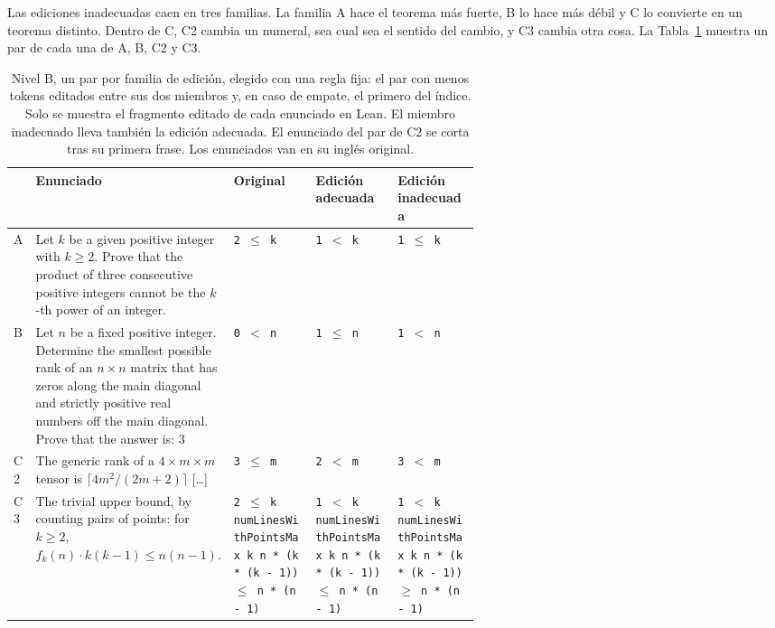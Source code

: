 \documentclass[10pt]{article}
\begin{document}
Las ediciones inadecuadas caen en tres familias. La familia A hace el teorema más fuerte, B lo hace más débil y C
lo convierte en un teorema distinto. Dentro de C, C2 cambia un numeral, sea cual sea el sentido del cambio, y C3 cambia otra cosa.
La Tabla~\ref{tab:bejemplos} muestra un par de cada una de A, B, C2 y C3.

\begin{table}[h]
\centering
\caption{Nivel B, un par por familia de edición, elegido con una regla fija: el par con menos tokens editados entre sus dos miembros y, en caso de empate, el primero del índice. Solo se muestra el fragmento editado de cada enunciado en Lean. El miembro inadecuado lleva también la edición adecuada. El enunciado del par de C2 se corta tras su primera frase. Los enunciados van en su inglés original.}
\label{tab:bejemplos}
\vspace{2pt}
{\footnotesize
\begin{tabularx}{\linewidth}{@{}lX>{\raggedright\arraybackslash}p{0.2\linewidth}>{\raggedright\arraybackslash}p{0.2\linewidth}>{\raggedright\arraybackslash}p{0.2\linewidth}@{}}
\toprule
 & Enunciado & Original & Edición adecuada & Edición inadecuada\\
\midrule
A & Let \(k\) be a given positive integer with \(k\geqslant2\). Prove that the product of three consecutive positive integers cannot be the \(k\) -th power of an integer. & \texttt{2 $\le$ k} & \texttt{1 $<$ k} & \texttt{1 $\le$ k}\\
\addlinespace
B & Let $n$ be a fixed positive integer. Determine the smallest possible rank of an $n \times n$ matrix that has zeros along the main diagonal and strictly positive real numbers off the main diagonal. Prove that the answer is: 3 & \texttt{0 $<$ n} & \texttt{1 $\le$ n} & \texttt{1 $<$ n}\\
\addlinespace
C2 & The generic rank of a $4 \times m \times m$ tensor is $\lceil 4m^2 / (2m + 2) \rceil$ [\ldots] & \texttt{3 $\le$ m} & \texttt{2 $<$ m} & \texttt{3 $<$ m}\\
\addlinespace
C3 & The trivial upper bound, by counting pairs of points: for $k \geq 2$, $f_k(n) \cdot k(k-1) \leq n(n-1).$ & \texttt{2 $\le$ k} \newline \texttt{numLinesWithPointsMax k n * (k * (k - 1)) $\le$ n * (n - 1)} & \texttt{1 $<$ k} \newline \texttt{numLinesWithPointsMax k n * (k * (k - 1)) $\le$ n * (n - 1)} & \texttt{1 $<$ k} \newline \texttt{numLinesWithPointsMax k n * (k * (k - 1)) $\ge$ n * (n - 1)}\\
\bottomrule
\end{tabularx}}
\end{table}
\end{document}
